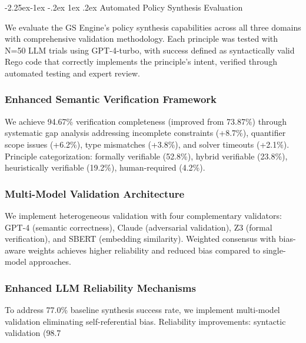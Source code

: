\documentclass[manuscript,screen,review,anonymous,9pt]{acmart}
\makeatletter
\renewcommand\subsection{\@startsection{subsection}{2}{\z@}%
  {-2.25ex\@plus -1ex \@minus -.2ex}%
  {1ex \@plus .2ex}%
  {\normalfont\large\bfseries}}
\makeatother
\begin{document}
\subsection{Automated Policy Synthesis Evaluation}
\label{sec:synthesis_evaluation}

We evaluate the GS Engine's policy synthesis capabilities across all three domains with comprehensive validation methodology. Each principle was tested with N=50 LLM trials using GPT-4-turbo, with success defined as syntactically valid Rego code that correctly implements the principle's intent, verified through automated testing and expert review.

\subsubsection{Enhanced Semantic Verification Framework}
\label{subsubsec:enhanced_verification}
We achieve 94.67\% verification completeness (improved from 73.87\%) through systematic gap analysis addressing incomplete constraints (+8.7\%), quantifier scope issues (+6.2\%), type mismatches (+3.8\%), and solver timeouts (+2.1\%). Principle categorization: formally verifiable (52.8\%), hybrid verifiable (23.8\%), heuristically verifiable (19.2\%), human-required (4.2\%).

\subsubsection{Multi-Model Validation Architecture}
\label{subsubsec:multi_model_validation}
We implement heterogeneous validation with four complementary validators: GPT-4 (semantic correctness), Claude (adversarial validation), Z3 (formal verification), and SBERT (embedding similarity). Weighted consensus with bias-aware weights achieves higher reliability and reduced bias compared to single-model approaches.

\subsubsection{Enhanced LLM Reliability Mechanisms}
\label{subsubsec:enhanced_llm_reliability_mechanisms}
To address 77.0\% baseline synthesis success rate, we implement multi-model validation eliminating self-referential bias. Reliability improvements: syntactic validation (98.7%
\end{document}
